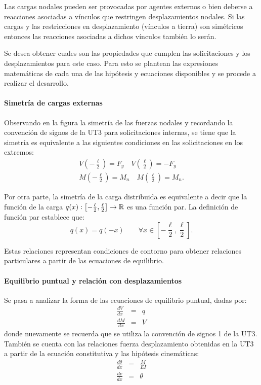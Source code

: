 Las cargas nodales pueden ser provocadas por agentes externos o bien deberse a reacciones asociadas a vínculos que restringen desplazamientos nodales. %
%
Si las cargas y las restricciones en desplazamiento (vínculos a tierra) son simétricos entonces las reacciones asociadas a dichos vínculos también lo serán. %

Se desea obtener cuales son las propiedades que cumplen las solicitaciones y los desplazamientos para este caso. %
%
Para esto se plantean las expresiones matemáticas de cada una de las hipótesis y ecuaciones disponibles y se procede a realizar el desarrollo.

\paragraph{Simetría de cargas externas}
%
Observando en la figura la simetría de las fuerzas nodales y recordando la convención de signos de la UT3 para solicitaciones internas, se tiene que la simetría es equivalente a las siguientes condiciones en las solicitaciones en los extremos:
%
\begin{eqnarray}
V \left(-\frac{\ell}{2}\right) = F_y \quad 
V\left( \frac{\ell}{2}\right) = -F_y \\
M\left( -\frac{\ell}{2}\right) = M_n \quad
M\left( \frac{\ell}{2} \right) = M_n.
\end{eqnarray}
%

Por otra parte, la simetría de la carga distribuida es equivalente a decir que la función de la carga $q(x):\left[-\frac{\ell}{2},\frac{\ell}{2} \right] \rightarrow {\mathbb R}$ es una función par. %
%
La definición de función par establece que:
\begin{equation}
q( x) = q(-x) \qquad \forall x \in \left[-\frac{\ell}{2},\frac{\ell}{2} \right].
\end{equation}

Estas relaciones representan condiciones de contorno para obtener relaciones particulares a partir de las ecuaciones de equilibrio.

\paragraph{Equilibrio puntual y relación con desplazamientos}
Se pasa a analizar la forma de las ecuaciones de equilibrio puntual, dadas por:
\begin{eqnarray}
\frac{dV}{d x} &=& q \\
\frac{dM}{d x} &=& V
\end{eqnarray}
donde nuevamente se recuerda que se utiliza la convención de signos 1 de la UT3. También se cuenta con las relaciones fuerza desplazamiento obtenidas en la UT3 a partir de la ecuación constitutiva y las hipótesis cinemáticas:
\begin{eqnarray}
\frac{d\theta}{d x} &=& \frac{M}{E I} \\
\frac{dv}{d x} &=& \theta
\end{eqnarray}



